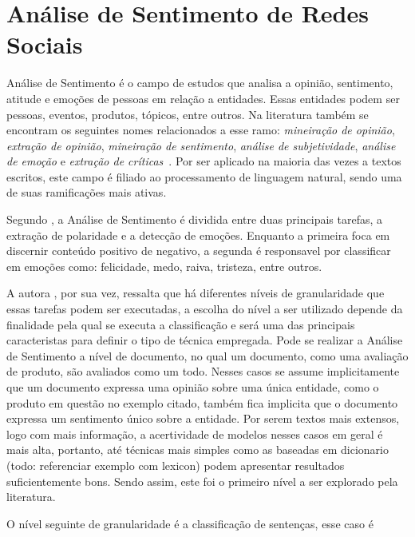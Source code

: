 \chapter{Análise de Sentimento de Redes Sociais}
\label{chapter:sentiment}

Análise de Sentimento é o campo de estudos que analisa a opinião, sentimento,
atitude e emoções de pessoas em relação a entidades.
Essas entidades podem ser pessoas, eventos, produtos, tópicos, entre outros.
Na literatura também se encontram os seguintes nomes relacionados a esse ramo:
\textit{mineiração de opinião}, \textit{extração de opinião},
\textit{mineiração de sentimento}, \textit{análise de subjetividade},
\textit{análise de emoção} e \textit{extração de críticas}~\cite{liu15}.
Por ser aplicado na maioria das vezes a textos escritos, este campo é filiado
ao processamento de linguagem natural, sendo uma de suas ramificações mais
ativas.

Segundo \citet{cambria16}, a Análise de Sentimento é dividida entre duas
principais tarefas, a extração de polaridade e a detecção de emoções.
Enquanto a primeira foca em discernir conteúdo positivo de negativo, a segunda é
responsavel por classificar em emoções como: felicidade, medo, raiva, tristeza,
entre outros.

A autora \citet{liu15}, por sua vez, ressalta que há diferentes níveis de
granularidade que essas tarefas podem ser executadas, a escolha do nível a ser
utilizado depende da finalidade pela qual se executa a classificação e será uma
das principais caracteristas para definir o tipo de técnica empregada.
Pode se realizar a Análise de Sentimento a nível de documento, no qual um
documento, como uma avaliação de produto, são avaliados como um todo.
Nesses casos se assume implicitamente que um documento expressa uma opinião
sobre uma única entidade, como o produto em questão no exemplo citado, também
fica implicita que o documento expressa um sentimento único sobre a entidade.
Por serem textos mais extensos, logo com mais informação, a acertividade de
modelos nesses casos em geral é mais alta, portanto, até técnicas mais simples
como as baseadas em dicionario (todo: referenciar exemplo com lexicon) podem
apresentar resultados suficientemente bons.
Sendo assim, este foi o primeiro nível a ser explorado pela literatura.

O nível seguinte de granularidade é a classificação de sentenças, esse caso é

%

